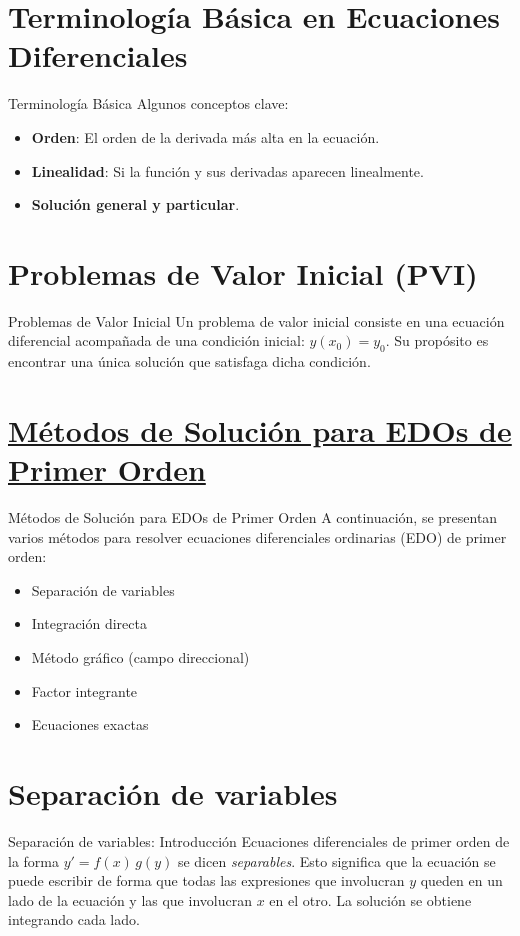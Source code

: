 \documentclass{beamer}
\begin{document}
\section{Terminología Básica en Ecuaciones Diferenciales}
\begin{frame}{Terminología Básica}
Algunos conceptos clave:
\begin{itemize}
  \item \textbf{Orden}: El orden de la derivada más alta en la ecuación.
  \item \textbf{Linealidad}: Si la función y sus derivadas aparecen linealmente.
  \item \textbf{Solución general y particular}.
\end{itemize}
\end{frame}

\section{Problemas de Valor Inicial (PVI)}
\begin{frame}{Problemas de Valor Inicial}
Un problema de valor inicial consiste en una ecuación diferencial acompañada de una condición inicial: $y(x_0) = y_0$. Su propósito es encontrar una única solución que satisfaga dicha condición.
\end{frame}

\section[Métodos de Solución]{\texorpdfstring{\hyperlink{metodos}{Métodos de Solución para EDOs de Primer Orden}}{}}
\begin{frame}[label=metodos]{Métodos de Solución para EDOs de Primer Orden}
A continuación, se presentan varios métodos para resolver ecuaciones diferenciales ordinarias (EDO) de primer orden:
\begin{itemize}
  \item Separación de variables
  \item Integración directa
  \item Método gráfico (campo direccional)
  \item Factor integrante
  \item Ecuaciones exactas
\end{itemize}
\end{frame}


\section*{Separación de variables}
\begin{frame}{Separación de variables: Introducción}
Ecuaciones diferenciales de primer orden de la forma $y' = f(x)\,g(y)$ se dicen \emph{separables}. Esto significa que la ecuación se puede escribir de forma que todas las expresiones que involucran $y$ queden en un lado de la ecuación y las que involucran $x$ en el otro. La solución se obtiene integrando cada lado.
\end{frame}
\end{document}
